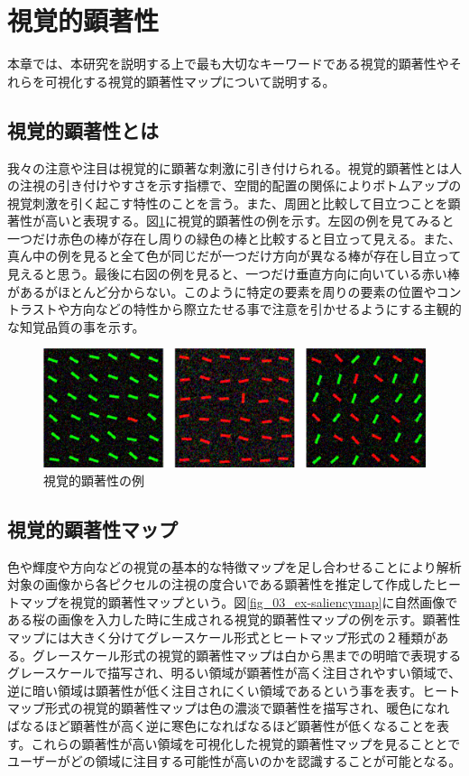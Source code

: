 \newpage
\renewcommand{\baselinestretch}{1.5}
\section{視覚的顕著性}\label{sec:visula_saliency}
\renewcommand{\baselinestretch}{1}
\par 本章では、本研究を説明する上で最も大切なキーワードである視覚的顕著性やそれらを可視化する視覚的顕著性マップについて説明する。

\subsection{視覚的顕著性とは}
\par 我々の注意や注目は視覚的に顕著な刺激に引き付けられる。視覚的顕著性とは人の注視の引き付けやすさを示す指標で、空間的配置の関係によりボトムアップの視覚刺激を引く起こす特性のことを言う。また、周囲と比較して目立つことを顕著性が高いと表現する。図\ref{fig_whats-saliency}に視覚的顕著性の例を示す。左図の例を見てみると一つだけ赤色の棒が存在し周りの緑色の棒と比較すると目立って見える。また、真ん中の例を見ると全て色が同じだが一つだけ方向が異なる棒が存在し目立って見えると思う。最後に右図の例を見ると、一つだけ垂直方向に向いている赤い棒があるがほとんど分からない。このように特定の要素を周りの要素の位置やコントラストや方向などの特性から際立たせる事で注意を引かせるようにする主観的な知覚品質の事を示す\cite{Itti:2007}。

\begin{figure}[H]
    \centering
    \includegraphics[width=12cm]{figures/whats-saliency.png}
    \caption{視覚的顕著性の例\cite{Itti:2007}}
    \label{fig_whats-saliency}
\end{figure}

\subsection{視覚的顕著性マップ}\label{subsec:saliency_map}
\par 色や輝度や方向などの視覚の基本的な特徴マップを足し合わせることにより解析対象の画像から各ピクセルの注視の度合いである顕著性を推定して作成したヒートマップを視覚的顕著性マップという。図\ref{fig_03_ex-saliencymap}に自然画像である桜の画像を入力した時に生成される視覚的顕著性マップの例を示す。顕著性マップには大きく分けてグレースケール形式とヒートマップ形式の２種類がある。グレースケール形式の視覚的顕著性マップは白から黒までの明暗で表現するグレースケールで描写され、明るい領域が顕著性が高く注目されやすい領域で、逆に暗い領域は顕著性が低く注目されにくい領域であるという事を表す。ヒートマップ形式の視覚的顕著性マップは色の濃淡で顕著性を描写され、暖色になればなるほど顕著性が高く逆に寒色になればなるほど顕著性が低くなることを表す。これらの顕著性が高い領域を可視化した視覚的顕著性マップを見ることとでユーザーがどの領域に注目する可能性が高いのかを認識することが可能となる。

